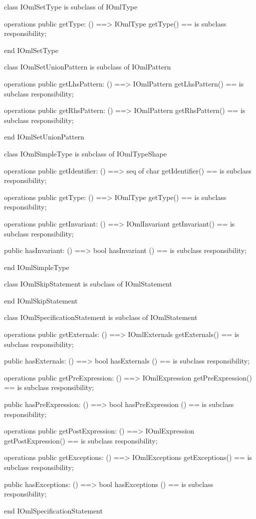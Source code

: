 \begin{vdm_al}
class IOmlSetType
 is subclass of IOmlType

operations
  public getType: () ==> IOmlType
  getType() == is subclass responsibility;

end IOmlSetType
\end{vdm_al}

\begin{vdm_al}
class IOmlSetUnionPattern
 is subclass of IOmlPattern

operations
  public getLhsPattern: () ==> IOmlPattern
  getLhsPattern() == is subclass responsibility;

operations
  public getRhsPattern: () ==> IOmlPattern
  getRhsPattern() == is subclass responsibility;

end IOmlSetUnionPattern
\end{vdm_al}

\begin{vdm_al}
class IOmlSimpleType
 is subclass of IOmlTypeShape

operations
  public getIdentifier: () ==> seq of char
  getIdentifier() == is subclass responsibility;

operations
  public getType: () ==> IOmlType
  getType() == is subclass responsibility;

operations
  public getInvariant: () ==> IOmlInvariant
  getInvariant() == is subclass responsibility;

  public hasInvariant: () ==> bool
  hasInvariant () == is subclass responsibility;

end IOmlSimpleType
\end{vdm_al}

\begin{vdm_al}
class IOmlSkipStatement
 is subclass of IOmlStatement

end IOmlSkipStatement
\end{vdm_al}

\begin{vdm_al}
class IOmlSpecificationStatement
 is subclass of IOmlStatement

operations
  public getExternals: () ==> IOmlExternals
  getExternals() == is subclass responsibility;

  public hasExternals: () ==> bool
  hasExternals () == is subclass responsibility;

operations
  public getPreExpression: () ==> IOmlExpression
  getPreExpression() == is subclass responsibility;

  public hasPreExpression: () ==> bool
  hasPreExpression () == is subclass responsibility;

operations
  public getPostExpression: () ==> IOmlExpression
  getPostExpression() == is subclass responsibility;

operations
  public getExceptions: () ==> IOmlExceptions
  getExceptions() == is subclass responsibility;

  public hasExceptions: () ==> bool
  hasExceptions () == is subclass responsibility;

end IOmlSpecificationStatement
\end{vdm_al}

